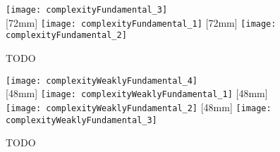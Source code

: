 \blindtext{}

\begin{figure}
  \texttt{[image: complexityFundamental\_3]}\\[2mm]%
  [72mm]{%
    \texttt{[image: complexityFundamental\_1]}%
  }%
  \hfill%
  [72mm]{%
    \texttt{[image: complexityFundamental\_2]}%
  }%
  \caption[TODO]{%
    TODO%
  }%
  \label{fig:TODO1}%
\end{figure}


\begin{figure}
  \texttt{[image: complexityWeaklyFundamental\_4]}\\[2mm]%
  [48mm]{%
    \texttt{[image: complexityWeaklyFundamental\_1]}%
  }%
  \hfill%
  [48mm]{%
    \texttt{[image: complexityWeaklyFundamental\_2]}%
  }%
  \hfill%
  [48mm]{%
    \texttt{[image: complexityWeaklyFundamental\_3]}%
  }%
  \caption[TODO]{%
    TODO%
  }%
  \label{fig:TODO2}%
\end{figure}

